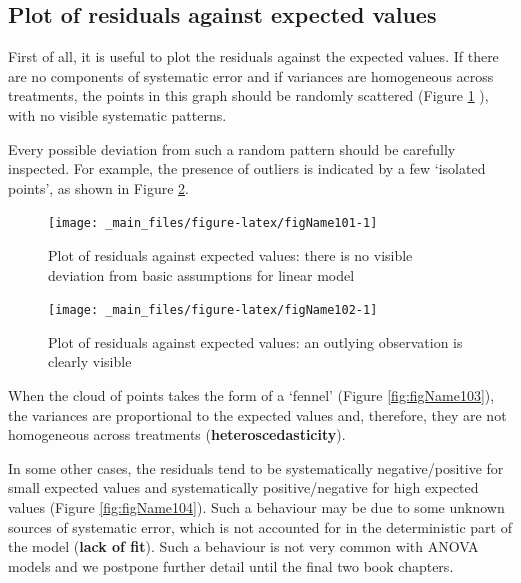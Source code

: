 \documentclass[a4paper,12pt,oneside]{book}
\begin{document}
\hypertarget{plot-of-residuals-against-expected-values}{%
\subsection{Plot of residuals against expected values}\label{plot-of-residuals-against-expected-values}}

First of all, it is useful to plot the residuals against the expected values. If there are no components of systematic error and if variances are homogeneous across treatments, the points in this graph should be randomly scattered (Figure \ref{fig:figName101} ), with no visible systematic patterns.

Every possible deviation from such a random pattern should be carefully inspected. For example, the presence of outliers is indicated by a few `isolated points', as shown in Figure \ref{fig:figName102}.

\begin{figure}

{\centering \texttt{[image: \_main\_files/figure-latex/figName101-1]} 

}

\caption{Plot of residuals against expected values: there is no visible deviation from basic assumptions for linear model}\label{fig:figName101}
\end{figure}

\begin{figure}

{\centering \texttt{[image: \_main\_files/figure-latex/figName102-1]} 

}

\caption{Plot of residuals against expected values: an outlying observation is clearly visible}\label{fig:figName102}
\end{figure}

When the cloud of points takes the form of a `fennel' (Figure \ref{fig:figName103}), the variances are proportional to the expected values and, therefore, they are not homogeneous across treatments (\textbf{heteroscedasticity}).

In some other cases, the residuals tend to be systematically negative/positive for small expected values and systematically positive/negative for high expected values (Figure \ref{fig:figName104}). Such a behaviour may be due to some unknown sources of systematic error, which is not accounted for in the deterministic part of the model (\textbf{lack of fit}). Such a behaviour is not very common with ANOVA models and we postpone further detail until the final two book chapters.
\end{document}

